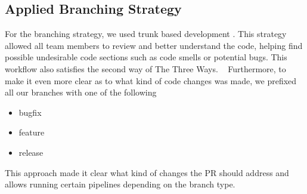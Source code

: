 \subsection{Applied Branching Strategy}
\label{branching:label}

For the branching strategy, we used trunk based development \cite{trunkdev}. This strategy allowed all team members to review and better understand the code, helping find possible undesirable code sections such as code smells or potential bugs. This workflow also satisfies the second way of The Three Ways. ~\cite{devOpsHandbook3W}
Furthermore, to make it even more clear as to what kind of code changes was made, we prefixed all our branches with one of the following

\begin{itemize}[noitemsep]
  \item bugfix
  \item feature
  \item release
\end{itemize}
This approach made it clear what kind of changes the PR should address and allows running certain pipelines depending on the branch type.

